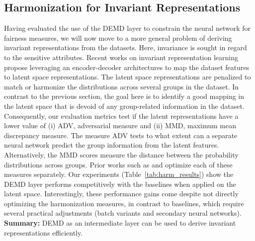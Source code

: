 \subsection{Harmonization for Invariant Representations}
Having evaluated the use of the DEMD layer to constrain the neural network for  fairness measures, we will now move to a more general problem of deriving invariant representations from the datasets. Here, invariance is sought in regard to the sensitive attributes. Recent works \citep{equivar} on invariant representation learning propose leveraging an encoder-decoder architectures to map the dataset features to latent space representations. The latent space representations are penalized to match or harmonize the distributions across several groups in the dataset. In contrast to the previous section, the goal here is to identify a good mapping in the latent space that is devoid of any group-related information in the dataset.  Consequently, our evaluation metrics test if the latent representations have a lower value of (i) ADV, adversarial measure and (ii) MMD, maximum mean discrepancy measure. The measure ADV tests to what extent can a separate neural network predict the group information from the latent features. Alternatively, the MMD scores measure the distance between the probability distributions across groups. Prior works such as \cite{zemel} and \cite{cai} optimize each of these measures separately. Our experiments (Table~\ref{tab:harm_results}) show the DEMD layer performs competitively with the baselines when applied on the latent space. Interestingly, these performance gains come despite not directly optimizing the harmonization measures, in contrast to baselines, which require several practical adjustments (batch variants and secondary neural networks).
{\bf Summary:} DEMD as an intermediate layer can be used to derive invariant representations efficiently.
